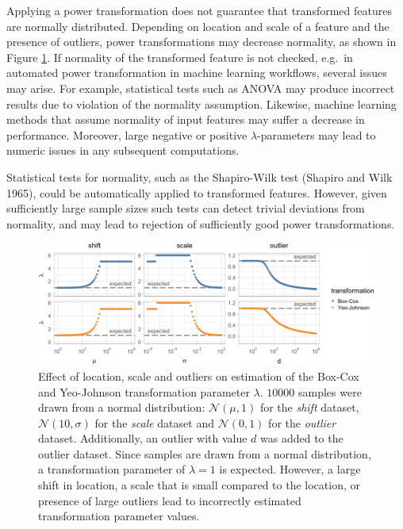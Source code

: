 \documentclass[
  a4paper,
]{article}
\begin{document}
Applying a power transformation does not guarantee that transformed
features are normally distributed. Depending on location and scale of a
feature and the presence of outliers, power transformations may decrease
normality, as shown in Figure \ref{fig:decreased-normality}. If
normality of the transformed feature is not checked, e.g.~in automated
power transformation in machine learning workflows, several issues may
arise. For example, statistical tests such as ANOVA may produce
incorrect results due to violation of the normality assumption.
Likewise, machine learning methods that assume normality of input
features may suffer a decrease in performance. Moreover, large negative
or positive \(\lambda\)-parameters may lead to numeric issues in any
subsequent computations.

Statistical tests for normality, such as the Shapiro-Wilk test (Shapiro
and Wilk 1965), could be automatically applied to transformed features.
However, given sufficiently large sample sizes such tests can detect
trivial deviations from normality, and may lead to rejection of
sufficiently good power transformations.

\begin{figure}

{\centering \includegraphics{manuscript_files/figure-latex/decreased-normality-1} 

}

\caption{Effect of location, scale and outliers on estimation of the Box-Cox and Yeo-Johnson transformation parameter $\lambda$. $10000$ samples were drawn from a normal distribution: $\mathcal{N}(\mu, 1)$ for the \textit{shift} dataset, $\mathcal{N}(10, \sigma)$ for the \textit{scale} dataset and $\mathcal{N}(0, 1)$ for the \textit{outlier} dataset. Additionally, an outlier with value $d$ was added to the outlier dataset. Since samples are drawn from a normal distribution, a transformation parameter of $\lambda = 1$ is expected. However, a large shift in location, a scale that is small compared to the location, or presence of large outliers lead to incorrectly estimated transformation parameter values.}\label{fig:decreased-normality}
\end{figure}
\end{document}
